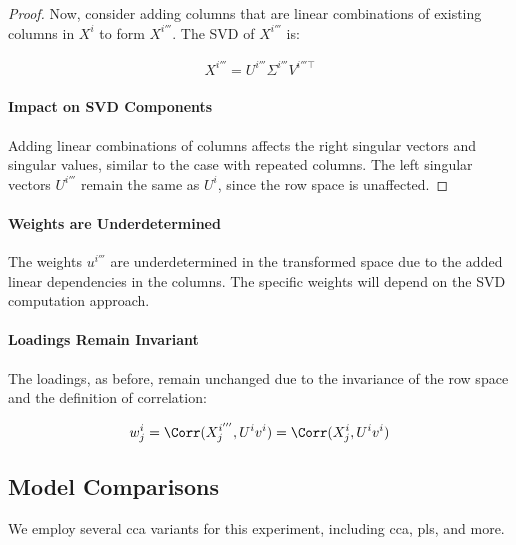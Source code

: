 \begin{proof}
Now, consider adding columns that are linear combinations of existing columns in \( X^{i} \) to form \( X^{i'''} \). The SVD of \( X^{i'''} \) is:

\begin{align}
    X^{i'''} = U^{i'''}\Sigma^{i'''}V^{i'''\top} \label{eq:svd_linear_combinations}
\end{align}

\paragraph{Impact on SVD Components}
Adding linear combinations of columns affects the right singular vectors and singular values, similar to the case with repeated columns. The left singular vectors \( U^{i'''} \) remain the same as \( U^{i} \), since the row space is unaffected.
\end{proof}

\paragraph{Weights are Underdetermined}
The weights \( u^{i'''} \) are underdetermined in the transformed space due to the added linear dependencies in the columns. The specific weights will depend on the SVD computation approach.

\paragraph{Loadings Remain Invariant}
The loadings, as before, remain unchanged due to the invariance of the row space and the definition of correlation:

\begin{align}\label{eq:loading_invariant_linear_combinations}
    w^{i}_j = \Corr(X^{i'''}_j, U^{i}v^{i}) = \Corr(X^{i}_j, U^{i}v^{i})
\end{align}

\subsection{Model Comparisons}
We employ several \acrshort{cca} variants for this experiment, including \acrshort{cca}, \acrshort{pls}, and more.

